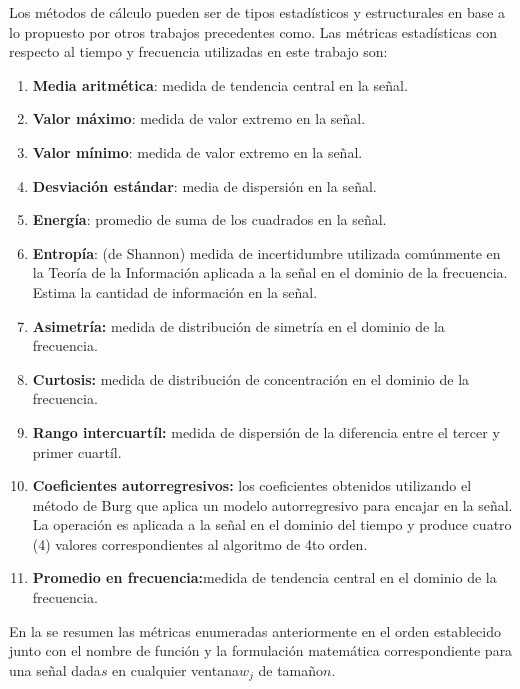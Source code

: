Los métodos de cálculo pueden ser de tipos estadísticos y estructurales
\cite{LaraLabrador2013} en base a lo propuesto por otros trabajos
precedentes como\cite{Yang2009,Bao2004}. Las métricas estadísticas
con respecto al tiempo y frecuencia utilizadas en este trabajo son:
\begin{enumerate}
\item \textbf{Media aritmética}: medida de tendencia central en la señal.
\item \textbf{Valor máximo}: medida de valor extremo en la señal.
\item \textbf{Valor mínimo}: medida de valor extremo en la señal.
\item \textbf{Desviación estándar}: media de dispersión en la señal.
\item \textbf{Energía}: promedio de suma de los cuadrados en la señal.
\item \textbf{Entropía}: (de Shannon) medida de incertidumbre utilizada
comúnmente en la Teoría de la Información aplicada a la señal en el
dominio de la frecuencia. Estima la cantidad de información en la
señal.
\item \textbf{Asimetría:} medida de distribución de simetría en el dominio
de la frecuencia.
\item \textbf{Curtosis:} medida de distribución de concentración en el dominio
de la frecuencia.
\item \textbf{Rango intercuartíl:} medida de dispersión de la diferencia
entre el tercer y primer cuartíl.
\item \textbf{Coeficientes autorregresivos:} los coeficientes obtenidos
utilizando el método de Burg que aplica un modelo autorregresivo para
encajar en la señal. La operación es aplicada a la señal en el dominio
del tiempo y produce cuatro (4) valores correspondientes al algoritmo
de 4to orden.
\item \textbf{Promedio en frecuencia:}medida de tendencia central en el
dominio de la frecuencia.
\end{enumerate}
En la  se resumen las métricas enumeradas anteriormente
en el orden establecido junto con el nombre de función y la formulación
matemática correspondiente para una señal dada$s$ en cualquier ventana$w_{j}$
de tamaño$n$.

